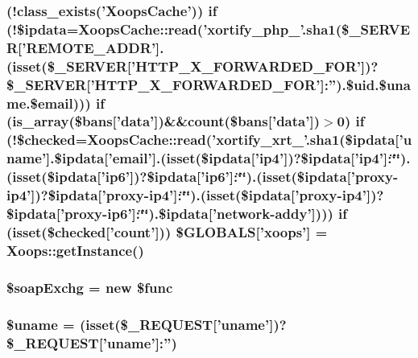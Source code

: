 \hypertarget{xortify_2post_8loader_8php_adaeadb8f91232ad6dbd52f394104cd19}{
\subsubsection[{\$\-G\-L\-O\-B\-A\-L\-S}]{ (!class\-\_\-exists('Xoops\-Cache')) {\bf if} (!\$ipdata=Xoops\-Cache\-::read('xortify\-\_\-php\-\_\-'.sha1(\$\-\_\-\-S\-E\-R\-V\-E\-R\mbox{[}'R\-E\-M\-O\-T\-E\-\_\-\-A\-D\-D\-R'\mbox{]}.(isset(\$\-\_\-\-S\-E\-R\-V\-E\-R\mbox{[}'H\-T\-T\-P\-\_\-\-X\-\_\-\-F\-O\-R\-W\-A\-R\-D\-E\-D\-\_\-\-F\-O\-R'\mbox{]})?\$\-\_\-\-S\-E\-R\-V\-E\-R\mbox{[}'H\-T\-T\-P\-\_\-\-X\-\_\-\-F\-O\-R\-W\-A\-R\-D\-E\-D\-\_\-\-F\-O\-R'\mbox{]}\-:'').\${\bf uid.\$uname.\$email}))) {\bf if} (is\-\_\-array(\$bans\mbox{[}'data'\mbox{]})\&\&count(\$bans\mbox{[}'data'\mbox{]})$>$0) {\bf if} (!\$checked=Xoops\-Cache\-::read('xortify\-\_\-xrt\-\_\-'.sha1(\$ipdata\mbox{[}'uname'\mbox{]}.\$ipdata\mbox{[}'email'\mbox{]}.(isset(\$ipdata\mbox{[}'ip4'\mbox{]})?\$ipdata\mbox{[}'ip4'\mbox{]}\-:\char`\"{}\char`\"{}).(isset(\$ipdata\mbox{[}'ip6'\mbox{]})?\$ipdata\mbox{[}'ip6'\mbox{]}\-:\char`\"{}\char`\"{}).(isset(\$ipdata\mbox{[}'proxy-\/ip4'\mbox{]})?\$ipdata\mbox{[}'proxy-\/ip4'\mbox{]}\-:\char`\"{}\char`\"{}).(isset(\$ipdata\mbox{[}'proxy-\/ip4'\mbox{]})?\$ipdata\mbox{[}'proxy-\/ip6'\mbox{]}\-:\char`\"{}\char`\"{}).\$ipdata\mbox{[}'network-\/addy'\mbox{]}))) {\bf if} (isset(\$checked\mbox{[}'count'\mbox{]})) \$G\-L\-O\-B\-A\-L\-S\mbox{[}'xoops'\mbox{]} = Xoops\-::get\-Instance()}}\label{xortify_2post_8loader_8php_adaeadb8f91232ad6dbd52f394104cd19}
\hypertarget{xortify_2post_8loader_8php_a566274d031ba42e22bf2b4fda50d0cf0}{
\subsubsection[{\$soap\-Exchg}]{\setlength{\rightskip}{0pt plus 5cm}\$soap\-Exchg = new \$func}}\label{xortify_2post_8loader_8php_a566274d031ba42e22bf2b4fda50d0cf0}
\hypertarget{xortify_2post_8loader_8php_a227a9443cabbe5e23cfc10c4371e09d1}{
\subsubsection[{\$uname}]{\setlength{\rightskip}{0pt plus 5cm}\$uname = (isset(\$\-\_\-\-R\-E\-Q\-U\-E\-S\-T\mbox{[}'uname'\mbox{]})?\$\-\_\-\-R\-E\-Q\-U\-E\-S\-T\mbox{[}'uname'\mbox{]}\-:'')}}\label{xortify_2post_8loader_8php_a227a9443cabbe5e23cfc10c4371e09d1}
